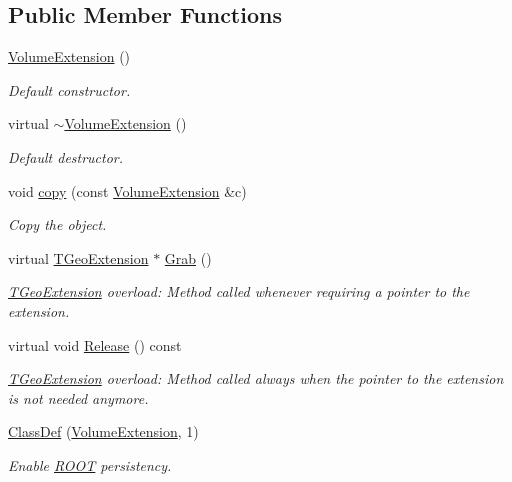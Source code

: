 \subsection*{Public Member Functions}
\begin{DoxyCompactItemize}
\item 
\hyperlink{class_d_d4hep_1_1_geometry_1_1_volume_extension_aa9342f53440b4c2c5e56c848868368a5}{Volume\+Extension} ()
\begin{DoxyCompactList}\small\item\em Default constructor. \end{DoxyCompactList}\item 
virtual \hyperlink{class_d_d4hep_1_1_geometry_1_1_volume_extension_a86b8adbb7fefd161d386f958db8b9be4}{$\sim$\+Volume\+Extension} ()
\begin{DoxyCompactList}\small\item\em Default destructor. \end{DoxyCompactList}\item 
void \hyperlink{class_d_d4hep_1_1_geometry_1_1_volume_extension_a9384fd683e751216c07236b8f1e400c2}{copy} (const \hyperlink{class_d_d4hep_1_1_geometry_1_1_volume_extension}{Volume\+Extension} \&c)
\begin{DoxyCompactList}\small\item\em Copy the object. \end{DoxyCompactList}\item 
virtual \hyperlink{class_t_geo_extension}{T\+Geo\+Extension} $\ast$ \hyperlink{class_d_d4hep_1_1_geometry_1_1_volume_extension_adc072e1c3a4be273940579938c6be398}{Grab} ()
\begin{DoxyCompactList}\small\item\em \hyperlink{class_t_geo_extension}{T\+Geo\+Extension} overload\+: Method called whenever requiring a pointer to the extension. \end{DoxyCompactList}\item 
virtual void \hyperlink{class_d_d4hep_1_1_geometry_1_1_volume_extension_a9351245472026a410a0b3d1c95c1302e}{Release} () const
\begin{DoxyCompactList}\small\item\em \hyperlink{class_t_geo_extension}{T\+Geo\+Extension} overload\+: Method called always when the pointer to the extension is not needed anymore. \end{DoxyCompactList}\item 
\hyperlink{class_d_d4hep_1_1_geometry_1_1_volume_extension_abdf0afaa48f61a81e56d99f4a7f2ae6b}{Class\+Def} (\hyperlink{class_d_d4hep_1_1_geometry_1_1_volume_extension}{Volume\+Extension}, 1)
\begin{DoxyCompactList}\small\item\em Enable \hyperlink{namespace_r_o_o_t}{R\+O\+OT} persistency. \end{DoxyCompactList}\end{DoxyCompactItemize}
